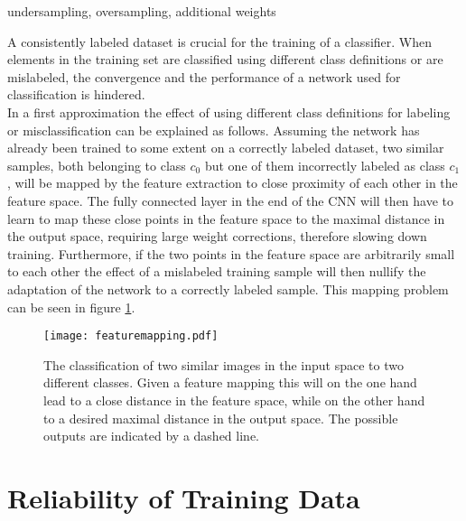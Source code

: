 undersampling, oversampling, additional weights



A consistently labeled dataset is crucial for the training of a classifier. When elements in the training set are classified using different class definitions or are mislabeled, the convergence and the performance of a network used for classification is hindered. \\

In a first approximation the effect of using different class definitions for labeling or misclassification can be explained as follows. Assuming the network has already been trained to some extent on a correctly labeled dataset, two similar samples, both belonging to class $c_0$ but one of them incorrectly labeled as class $c_1$, will be mapped by the feature extraction to close proximity of each other in the feature space. The fully connected layer in the end of the CNN will then have to learn to map these close points in the feature space to the maximal distance in the output space, requiring large weight corrections, therefore slowing down training. Furthermore, if the two points in the feature space are arbitrarily small to each other the effect of a mislabeled training sample will then nullify the adaptation of the network to a correctly labeled sample. This mapping problem can be seen in figure \ref{fig:featuremapping}.

\begin{figure}[H]
\centering
\texttt{[image: featuremapping.pdf]}
\caption{The classification of two similar images in the input space to two different classes. Given a feature mapping this will on the one hand lead to a close distance in the feature space, while on the other hand to a desired maximal distance in the output space. The possible outputs are indicated by a dashed line.}
\label{fig:featuremapping}
\end{figure}


\section{Reliability of Training Data}

